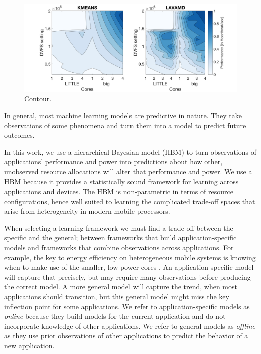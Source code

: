 \begin{figure}
\centering
\includegraphics[width=\columnwidth]{figures/performance-contour2.png}
\caption{Contour.}
  \label{fig:contour}
\end{figure}
In general, most machine learning models are predictive in nature.
They take observations of some phenomena and turn them into a model to
predict future outcomes.

In this work, we use a hierarchical Bayesian model (HBM) to turn
observations of applications' performance and power into predictions
about how other, unobserved resource allocations will alter that
performance and power.  We use a HBM because it provides a
statistically sound framework for learning across applications and
devices.  The HBM is non-parametric in terms of resource
configurations, hence well suited to learning the complicated
trade-off spaces that arise from heterogeneity in modern mobile
processors.

When selecting a learning framework we must find a trade-off between
the specific and the general; \ie between frameworks that build
application-specific models and frameworks that combine observations
across applications.  For example, the key to energy efficiency on
heterogeneous mobile systems is knowing when to make use of the
smaller, low-power cores \cite{reddiHPCA2013,POET}.  An
application-specific model will capture that precisely, but may
require many observations before producing the correct model.  A more
general model will capture the trend, \eg when most applications
should transition, but this general model might miss the key
inflection point for some applications.  We refer to
application-specific models as \emph{online} because they build models
for the current application and do not incorporate knowledge of other
applications.  We refer to general models as \emph{offline} as they
use prior observations of other applications to predict the behavior
of a new application.

